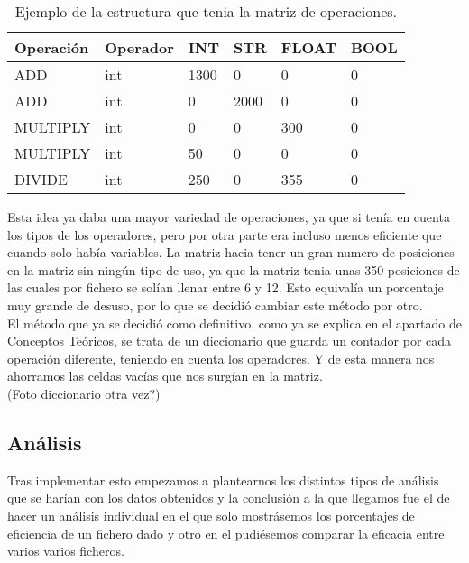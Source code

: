 \begin{table}[htbp]
\begin{center}
\begin{tabular}{|l|l|l|l|l|l|}
\hline
Operación & Operador & INT & STR & FLOAT & BOOL \\
\hline \hline
ADD & int & 1300 & 0 & 0 & 0\\ \hline
ADD & int & 0 & 2000 & 0 & 0 \\ \hline
MULTIPLY & int & 0 & 0 & 300 & 0 \\ \hline
MULTIPLY & int & 50 & 0 & 0 & 0 \\ \hline
DIVIDE & int & 250 & 0 & 355 & 0 \\ \hline
\end{tabular}
\caption{Ejemplo de la estructura que tenia la matriz de operaciones.}

\label{tabla:sencilla}
\end{center}
\end{table}

Esta idea ya daba una mayor variedad de operaciones, ya que si tenía en cuenta los tipos de los operadores, pero por otra parte era incluso menos eficiente que cuando solo había variables. La matriz hacia tener un gran numero de posiciones en la matriz sin ningún tipo de uso, ya que la matriz tenia unas 350 posiciones de las cuales por fichero se solían llenar entre 6 y 12. Esto equivalía un porcentaje muy grande de desuso, por lo que se decidió cambiar este método por otro.\\

El método que ya se decidió como definitivo, como ya se explica en el apartado de Conceptos Teóricos, se trata de  un diccionario que guarda un contador por cada operación diferente, teniendo en cuenta los operadores. Y de esta manera nos ahorramos las celdas vacías que nos surgían en la matriz.\\
(Foto diccionario otra vez?)\\

\subsection{Análisis}
Tras implementar esto empezamos a plantearnos los distintos tipos de análisis que se harían con los datos obtenidos y la conclusión a la que llegamos fue el  de hacer un análisis individual en el que solo mostrásemos los porcentajes de eficiencia de un fichero dado y otro en el pudiésemos comparar la eficacia entre varios varios ficheros.\\

